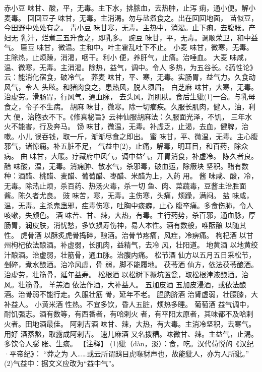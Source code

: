 \documentclass[12pt,UTF8]{ctexbook}
\begin{document}
赤小豆 味甘、酸，平，无毒。主下水，排脓血，去热肿，止泻
痢，通小便。解小麦毒。
回回豆子 味甘，无毒。主消渴。勿与盐煮食之。出在回回地面，
苗似豆，今田野中处处有之。
青小豆 味甘寒，无毒。主热中，消渴。止下痢，去腹胀。产妇无
乳汁，烂煮三五升食之，即乳多。
豌豆 味甘，平，无毒。调顺荣卫，和中益气。
匾豆 味甘，微温。主和中。叶主霍乱吐下不止。
小麦 味甘，微寒，无毒。主除热，止烦躁，消渴，咽干。利小
便，养肝气，止痛。治唾血。
大麦 味咸，温、微寒，无毒。主消渴。除热，益气，调中。令人
多热，为五谷长。《药性论》云：能消化宿食，破冷气。
荞麦 味甘，平、寒，无毒。实肠胃，益气力。久食动风气，令人
头眩。和猪肉食之，患热风，脱人须眉。
白芝麻 味甘，大寒，无毒。治虚劳。滑肠胃，行风气，通血脉，
去头风，润肌肤。食后生豼(1)一合。与乳母食之，令子不生病。
胡麻 味甘，微寒。除一切痼疾。久服长肌肉，健人。油，利大
便，治胞衣不下。《修真秘旨》云神仙服胡麻法：久服面光泽，不饥，
三年水火不能害，行及奔马。
饧 味甘，微温，无毒。补虚乏，止渴，去血，健脾，治嗽。小儿
误吞钱，取一斤，渐渐尽食之即出。
蜜 味甘，平、微温，无毒。主心腹邪气，诸惊痫。补五脏不足，
气益中(2)，止痛，解毒，明耳目，和百药，除众病。
曲 味甘，大暖。疗藏府中风气，调中益气，开胃消食，补虚冷。
陈久者良。
醋 味酸，温，无毒。消痈肿、散水气，杀邪毒，破血运，除癥块
坚积。醋有数种：酒醋、桃醋、麦醋、葡萄醋、枣醋、米醋为上，入药
用。
酱 味咸、酸，冷，无毒。除热止烦，杀百药、热汤火毒，杀一切
鱼、肉、菜蔬毒，豆酱主治胜面酱。陈久者尤良。
豉 味苦，寒，无毒。主伤寒，头痛，烦躁，满闷。
盐 味咸，温，无毒。主杀鬼蛊邪，疰毒伤寒，吐胸中痰癖，止心
腹卒痛。多食伤肺，令人咳嗽，失颜色。
酒 味苦、甘、辣，大热，有毒。主行药势，杀百邪，通血脉，厚
肠胃，润皮肤，消忧愁，多饮损寿伤神，易人本性。酒有数般，唯酝酿
以随其性。
虎骨酒 以酥炙虎骨捣碎，酿酒。治骨节疼痛，风疰，冷痹痛。
枸杞酒 以甘州枸杞依法酿酒。补虚弱，长肌肉，益精气，去冷
风，壮阳道。
地黄酒 以地黄绞汁酿酒。治虚弱，壮筋骨，通血脉。治腹内痛。
松节酒 仙方以五月五日采松节，剉碎，煮水酿酒。治冷风虚，骨
弱，脚不能履地。
茯苓酒 仙方，依法茯苓酿酒。治虚劳，壮筋骨，延年益寿。
松根酒 以松树下撅坑置瓮，取松根津液酿酒。治风。壮筋骨。
羊羔酒 依法作酒，大补益人。
五加皮酒 五加皮浸酒，或依法酿酒。治骨弱不能行走。久服壮筋
骨，延年不老。
腽肭脐酒 治肾虚弱，壮腰膝，大补益人。
小黄米酒 性热。不宜多饮，昏人五脏，烦热多睡。
葡萄酒 益气调中，耐饥强志。酒有数等，有西番者，有哈剌火
者，有平阳太原者，其味都不及哈剌火者。田地酒最佳。
阿剌吉酒 味甘、辣，大热，有大毒。主消冷坚积，去寒气。用好
酒蒸熬，取露成阿剌吉。
速儿麻酒 又名拨糟。味微甘、辣。主益气，止渴。多饮令人膨
胀、生痰。
【注释】
(1)豼（dàn，淡）：食，吃。汉代荀悦的《汉纪·平帝纪》：
“莽之为
人……或云所谓鸱目虎喙豺声也，故能豼人，亦为人所豼。”
(2)气益中：据文义应改为“益中气”。
\end{document}
